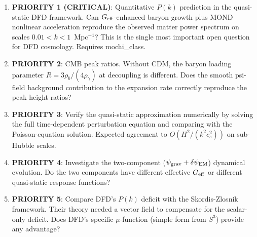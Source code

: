 \documentclass[11pt]{article}
\begin{document}
\begin{enumerate}
\item \textbf{PRIORITY 1 (CRITICAL)}: Quantitative $P(k)$ prediction in
  the quasi-static DFD framework. Can $G_{\rm eff}$-enhanced baryon growth
  plus MOND nonlinear acceleration reproduce the observed matter power
  spectrum on scales $0.01 < k < 1$~Mpc$^{-1}$? This is the single most
  important open question for DFD cosmology. Requires mochi\_class.

\item \textbf{PRIORITY 2}: CMB peak ratios. Without CDM, the baryon
  loading parameter $R = 3\rho_b/(4\rho_\gamma)$ at decoupling is
  different. Does the smooth psi-field background contribution to the
  expansion rate correctly reproduce the peak height ratios?

\item \textbf{PRIORITY 3}: Verify the quasi-static approximation
  numerically by solving the full time-dependent perturbation equation
  and comparing with the Poisson-equation solution. Expected agreement
  to $O(H^2/(k^2 c_s^2))$ on sub-Hubble scales.

\item \textbf{PRIORITY 4}: Investigate the two-component
  ($\psi_{\rm grav} + \delta\psi_{\rm EM}$) dynamical evolution.
  Do the two components have different effective $G_{\rm eff}$ or
  different quasi-static response functions?

\item \textbf{PRIORITY 5}: Compare DFD's $P(k)$ deficit with the
  Skordis-Zlosnik framework. Their theory needed a vector field to
  compensate for the scalar-only deficit. Does DFD's specific
  $\mu$-function (simple form from $S^3$) provide any advantage?
\end{enumerate}
\end{document}
